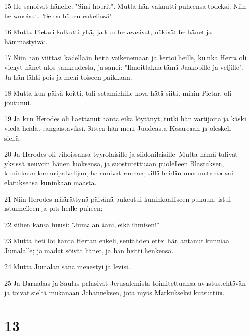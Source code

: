 \par 15 He sanoivat hänelle: "Sinä hourit". Mutta hän vakuutti puheensa todeksi. Niin he sanoivat: "Se on hänen enkelinsä".
\par 16 Mutta Pietari kolkutti yhä; ja kun he avasivat, näkivät he hänet ja hämmästyivät.
\par 17 Niin hän viittasi kädellään heitä vaikenemaan ja kertoi heille, kuinka Herra oli vienyt hänet ulos vankeudesta, ja sanoi: "Ilmoittakaa tämä Jaakobille ja veljille". Ja hän lähti pois ja meni toiseen paikkaan.
\par 18 Mutta kun päivä koitti, tuli sotamiehille kova hätä siitä, mihin Pietari oli joutunut.
\par 19 Ja kun Herodes oli haettanut häntä eikä löytänyt, tutki hän vartijoita ja käski viedä heidät rangaistaviksi. Sitten hän meni Juudeasta Kesareaan ja oleskeli siellä.
\par 20 Ja Herodes oli vihoissansa tyyrolaisille ja siidonilaisille. Mutta nämä tulivat yksissä neuvoin hänen luoksensa, ja suostutettuaan puolelleen Blastuksen, kuninkaan kamaripalvelijan, he anoivat rauhaa; sillä heidän maakuntansa sai elatuksensa kuninkaan maasta.
\par 21 Niin Herodes määrättynä päivänä pukeutui kuninkaalliseen pukuun, istui istuimelleen ja piti heille puheen;
\par 22 siihen kansa huusi: "Jumalan ääni, eikä ihmisen!"
\par 23 Mutta heti löi häntä Herran enkeli, sentähden ettei hän antanut kunniaa Jumalalle; ja madot söivät hänet, ja hän heitti henkensä.
\par 24 Mutta Jumalan sana menestyi ja levisi.
\par 25 Ja Barnabas ja Saulus palasivat Jerusalemista toimitettuansa avustustehtävän ja toivat sieltä mukanaan Johanneksen, jota myös Markukseksi kutsuttiin.

\chapter{13}

